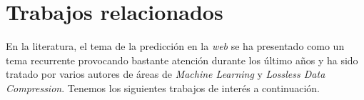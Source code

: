 \section{Trabajos relacionados}

En la literatura, el tema de la predicción en la \emph{web} se ha presentado como un tema recurrente provocando bastante atención durante los último años y ha sido tratado por varios autores de áreas de \emph{Machine Learning} y \emph{Lossless Data Compression}. Tenemos los siguientes trabajos de interés a continuación.





